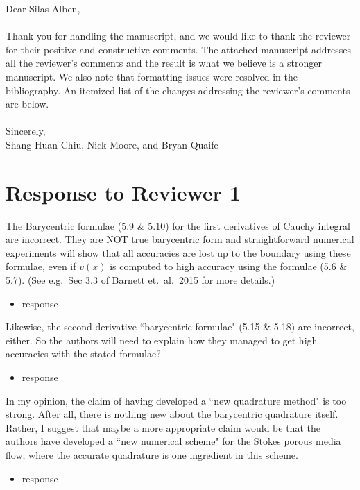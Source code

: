 \documentclass[11pt]{article}
\newcommand{\comment}[1]{{\color{blue} #1}}
\begin{document}
\noindent
Dear Silas Alben,
\\ \\
\noindent
Thank you for handling the manuscript, and we would like to thank the
reviewer for their positive and constructive comments.  The attached
manuscript addresses all the reviewer's comments and the result is what
we believe is a stronger manuscript.  We also note that formatting
issues were resolved in the bibliography. An itemized list of the
changes addressing the reviewer's comments are below.
\\ \\
\noindent
Sincerely,
\\
\noindent
Shang-Huan Chiu, Nick Moore, and Bryan Quaife

\section*{Response to Reviewer 1}

\noindent
\comment{The Barycentric formulae (5.9 \& 5.10) for the first
derivatives of Cauchy integral are incorrect. They are NOT true
barycentric form and straightforward numerical experiments will show
that all accuracies are lost up to the boundary using these formulae,
even if $v(x)$ is computed to high accuracy using the formulae (5.6 \&
5.7). (See e.g.~Sec 3.3 of Barnett et.~al.~2015 for more details.)}
\begin{itemize}
  \item response
\end{itemize}

\noindent
\comment{Likewise, the second derivative ``barycentric formulae" (5.15 \& 5.18) are incorrect, either. So the authors will need to explain how they managed to get high accuracies with the stated formulae?}
\begin{itemize}
  \item response
\end{itemize}

\noindent
\comment{In my opinion, the claim of having developed a ``new quadrature
method" is too strong. After all, there is nothing new about the
barycentric quadrature itself. Rather, I suggest that maybe a more
appropriate claim would be that the authors have developed a ``new
numerical scheme" for the Stokes porous media flow, where the accurate
quadrature is one ingredient in this scheme.}
\begin{itemize}
  \item response
\end{itemize}
\end{document}
